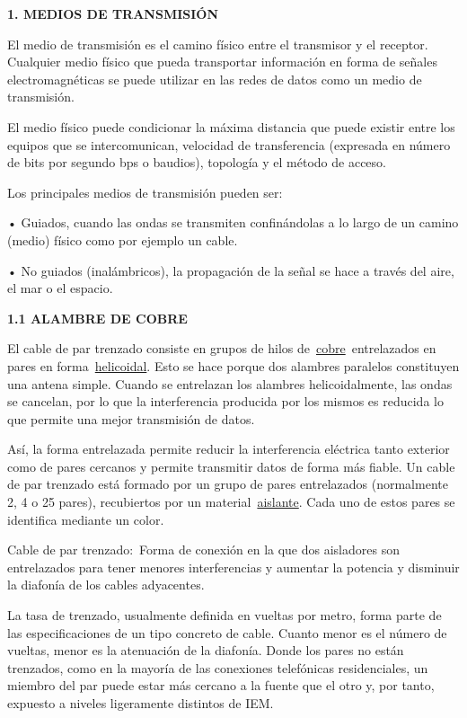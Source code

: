 \textbf{1. MEDIOS DE TRANSMISIÓN }

El medio de transmisión es el camino físico entre el transmisor y el
receptor. Cualquier medio físico que pueda transportar información en
forma de señales electromagnéticas se puede utilizar en las redes de
datos como un medio de transmisión.

El medio físico puede condicionar la máxima distancia que puede existir
entre los equipos que se intercomunican, velocidad de transferencia
(expresada en número de bits por segundo bps o baudios), topología y el
método de acceso.

Los principales medios de transmisión pueden ser:

• Guiados, cuando las ondas se transmiten confinándolas a lo largo de un
camino (medio) físico como por ejemplo un cable.

• No guiados (inalámbricos), la propagación de la señal se hace a través
del aire, el mar o el espacio.

\textbf{1.1 ALAMBRE DE COBRE}

El cable de par trenzado consiste en grupos de hilos
de~\href{https://es.wikipedia.org/wiki/Cobre}{cobre}~entrelazados en
pares en
forma~\href{https://es.wikipedia.org/wiki/H\%C3\%A9lice_(geometr\%C3\%ADa)}{helicoidal}.
Esto se hace porque dos alambres paralelos constituyen una antena
simple. Cuando se entrelazan los alambres helicoidalmente, las ondas se
cancelan, por lo que la interferencia producida por los mismos es
reducida lo que permite una mejor transmisión de datos.

Así, la forma entrelazada permite reducir la interferencia eléctrica
tanto exterior como de pares cercanos y permite transmitir datos de
forma más fiable. Un cable de par trenzado está formado por un grupo de
pares entrelazados (normalmente 2, 4 o 25 pares), recubiertos por un
material~\href{https://es.wikipedia.org/wiki/Aislamiento_el\%C3\%A9ctrico}{aislante}.
Cada uno de estos pares se identifica mediante un color.

Cable de par trenzado:~Forma de conexión en la que dos aisladores son
entrelazados para tener menores interferencias y aumentar la potencia y
disminuir la diafonía de los cables adyacentes.

La tasa de trenzado, usualmente definida en vueltas por metro, forma
parte de las especificaciones de un tipo concreto de cable. Cuanto menor
es el número de vueltas, menor es la atenuación de la diafonía. Donde
los pares no están trenzados, como en la mayoría de las conexiones
telefónicas residenciales, un miembro del par puede estar más cercano a
la fuente que el otro y, por tanto, expuesto a niveles ligeramente
distintos de IEM.

